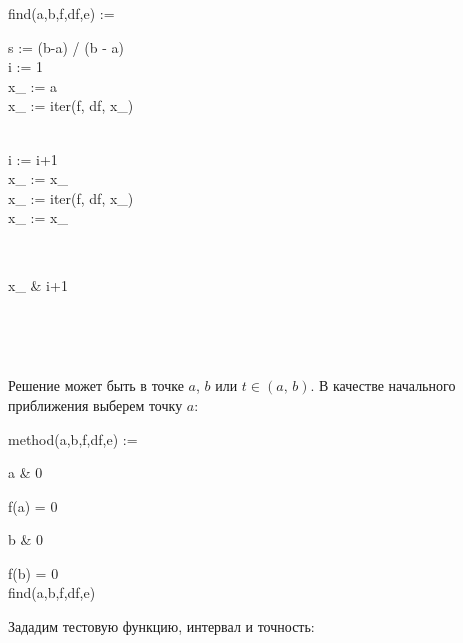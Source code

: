 \documentclass[a4paper, 14pt]{extarticle}
\begin{document}
\begin{preproc}
	find(a,b,f,df,e) := \begin{block}
		s := (b-a) / \abs(b - a)\\
		i := 1\\
		x_ := a\\
		x_ := iter(f, df, x_)\\
		\\
		\begin{block}
			i := i+1\\
			x_ := x_\\
			x_ := iter(f, df, x_)\\
			 x_ := x_\\
		\end{block}\\
		\begin{pmatrix}
			x_ & i+1
		\end{pmatrix}\\
	\end{block}\\
\end{preproc}
Решение может быть в точке $a$, $b$ или $t\in(a,\,b)$. В качестве начального приближения выберем точку $a$:
\begin{preproc}
	method(a,b,f,df,e) := \begin{caseblock}
		\begin{pmatrix}a & 0\end{pmatrix} \when f(a) = 0\\
		\begin{pmatrix}b & 0\end{pmatrix} \when f(b) = 0\\
		find(a,b,f,df,e) \otherwise\\
	\end{caseblock}
\end{preproc}
Зададим тестовую функцию, интервал и точность:
\end{document}

